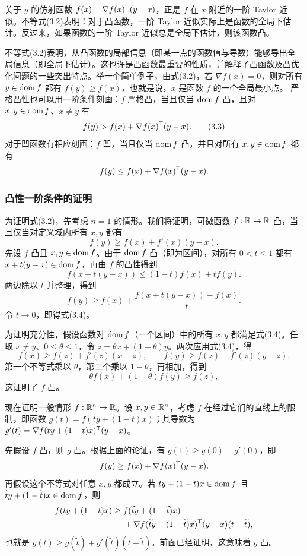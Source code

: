 关于 $y$ 的仿射函数 $f(x)+\nabla f(x)^\mathsf T(y-x)$，正是 $f$ 在 $x$ 附近的一阶 Taylor 近似。不等式(3.2)表明：对于凸函数，一阶 Taylor 近似实际上是函数的全局下估计。反过来，如果函数的一阶 Taylor 近似总是全局下估计，则该函数凸。

不等式(3.2)表明，从凸函数的局部信息（即某一点的函数值与导数）能够导出全局信息（即全局下估计）。这也许是凸函数最重要的性质，并解释了凸函数及凸优化问题的一些突出特点。举一个简单例子，由式(3.2)，若 $\nabla f(x)=0$，则对所有 $y\in\operatorname{dom} f$ 都有 $f(y)\geq f(x)$，也就是说，$x$ 是函数 $f$ 的一个全局最小点。
严格凸性也可以用一阶条件刻画：$f$ 严格凸，当且仅当 $\operatorname{dom} f$ 凸，且对 $x,y\in\operatorname{dom} f$、$x\ne y$ 有
\begin{equation}
 f(y)>f(x)+\nabla f(x)^\mathsf T(y-x).\tag{3.3}
\end{equation}
对于凹函数有相应刻画：$f$ 凹，当且仅当 $\operatorname{dom} f$ 凸，并且对所有 $x,y\in\operatorname{dom} f$ 都有
\[f(y)\leq f(x)+\nabla f(x)^\mathsf T(y-x).\]

\subsubsection*{凸性一阶条件的证明}
为证明式(3.2)，先考虑 $n=1$ 的情形。我们将证明，可微函数 $f:\mathbb R\to\mathbb R$ 凸，当且仅当对定义域内所有 $x,y$ 都有
\begin{equation}
 f(y)\geq f(x)+f'(x)(y-x).\tag{3.4}
\end{equation}
先设 $f$ 凸且 $x,y\in\operatorname{dom} f$。由于 $\operatorname{dom} f$ 凸（即为区间），对所有 $0<t\leq1$ 都有 $x+t(y-x)\in\operatorname{dom} f$，再由 $f$ 的凸性得到
\[f(x+t(y-x))\leq(1-t)f(x)+tf(y).\]
两边除以 $t$ 并整理，得到
\[f(y)\geq f(x)+\frac{f(x+t(y-x))-f(x)}{t}.\]
令 $t\to0$，即得式(3.4)。

为证明充分性，假设函数对 $\operatorname{dom} f$（一个区间）中的所有 $x,y$ 都满足式(3.4)。任取 $x\ne y$、$0\leq\theta\leq1$，令 $z=\theta x+(1-\theta)y$。两次应用式(3.4)，得
\[
 f(x)\geq f(z)+f'(z)(x-z),\qquad
 f(y)\geq f(z)+f'(z)(y-z).
\]
第一个不等式乘以 $\theta$，第二个乘以 $1-\theta$，再相加，得到
\[\theta f(x)+(1-\theta)f(y)\geq f(z),\]
这证明了 $f$ 凸。

现在证明一般情形 $f:\mathbb R^n\to\mathbb R$。设 $x,y\in\mathbb R^n$，考虑 $f$ 在经过它们的直线上的限制，即函数 $g(t)=f(ty+(1-t)x)$；其导数为 $g'(t)=\nabla f(ty+(1-t)x)^\mathsf T(y-x)$。

先假设 $f$ 凸，则 $g$ 凸。根据上面的论证，有 $g(1)\geq g(0)+g'(0)$，即
\[f(y)\geq f(x)+\nabla f(x)^\mathsf T(y-x).\]
再假设这个不等式对任意 $x,y$ 都成立。若 $ty+(1-t)x\in\operatorname{dom} f$ 且 $\widetilde t y+(1-\widetilde t)x\in\operatorname{dom} f$，则
\[
\begin{split}
 f(ty+(1-t)x)\geq{}& f(\widetilde t y+(1-\widetilde t)x)\\
 &+\nabla f(\widetilde t y+(1-\widetilde t)x)^\mathsf T(y-x)(t-\widetilde t),
\end{split}
\]
也就是 $g(t)\geq g(\widetilde t)+g'(\widetilde t)(t-\widetilde t)$。前面已经证明，这意味着 $g$ 凸。
